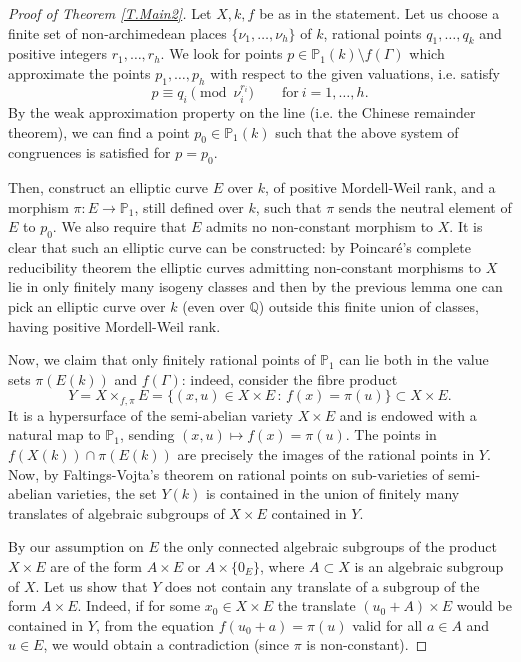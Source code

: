 \documentclass[10pt,a4paper]{amsart}
\def\P{{{\mathbb P}}}
\def\Q{{{\mathbb Q}}}
\begin{document}
\begin{proof}[ Proof of Theorem \ref{T.Main2}] 

Let $X,k,f$ be as in the statement. Let us choose a finite set of non-archimedean places $\{\nu_1,\ldots,\nu_h\}$ of $k$, rational points $q_1,\ldots,q_k$ and positive integers  $r_1,\ldots,r_h$. We look for points $p \in \P_1(k)\setminus f(\Gamma)$ which  approximate   the points $p_1,\ldots,p_h$ with respect to the given valuations, i.e. satisfy
\begin{equation}\label{E.approximation}
p\equiv q_i \pmod {\nu_i^{r_i}} \qquad \mathrm{for} \ i=1,\ldots,h.
\end{equation} 
By the weak approximation property on the line (i.e. the Chinese remainder theorem), we can find a point $p_0\in \P_1(k)$ such that the above system of congruences is satisfied for $p=p_0$.

Then, construct an elliptic curve $E$ over $k$, of positive Mordell-Weil rank, and a morphism $\pi:E\to \P_1$, still defined over $k$, such that $\pi$ sends the neutral element of $E$ to $p_0$. We also require that $E$ admits no non-constant morphism to $X$. 
It is clear that such an elliptic curve can be constructed: by Poincar\'e's complete reducibility theorem   the elliptic curves admitting non-constant morphisms to $X$ lie in only finitely many isogeny classes and then by the previous lemma one can pick an elliptic curve over $k$ (even over $\Q$) outside this finite union of classes, having positive Mordell-Weil rank. 

Now, we claim that only finitely rational points of $\P_1$ can lie both in the value sets   $\pi(E(k))$ and $f(\Gamma)$: indeed, consider the fibre product 
$$
Y=X\times_{f,\pi} E=\{(x,u)\in X\times E\, :\, f(x)=\pi(u)\}\subset X\times E.
$$
It is a hypersurface of the semi-abelian variety $X\times E$ and is endowed with a natural map to $\P_1$, sending $(x,u)\mapsto f(x)=\pi(u)$. The points in $f(X(k))\cap \pi(E(k))$ are precisely the images of the rational points in $Y$. Now, by Faltings-Vojta's theorem on rational points on sub-varieties of semi-abelian varieties, the set $Y(k)$ is contained in the union of finitely many translates of algebraic subgroups of $X\times E$ contained in $Y$.

By our assumption on $E$ the only connected algebraic subgroups of the product $X\times E$ are of the form  $A\times E$ or $A\times\{0_E\}$,  where $A\subset X$ is an algebraic subgroup of $X$. Let us show that  $Y$ does not contain any translate of a  subgroup of the form $A\times E$. Indeed,   if for some $x_0 \in X\times E$ the translate $(u_0+A)\times E$  would be contained in $Y$, from the equation $f(u_0+a)=\pi(u)$ valid for all $a\in A$ and $u\in E$, we would obtain a contradiction (since $\pi$ is non-constant).


\end{proof}
\end{document}
